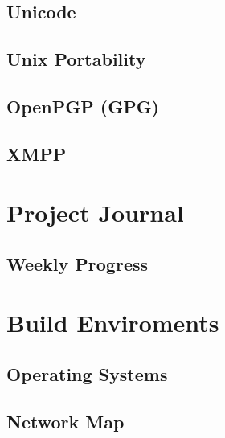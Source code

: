 \documentclass[a4paper,12pt]{report}
\begin{document}
\todo

\section{Unicode}



\section{Unix Portability}



\section{OpenPGP (GPG)}



\section{XMPP}

\todo

\chapter{Project Journal}

\label{chap:journal}

\section{Weekly Progress}

\label{sec:progress}

\todo


\chapter{Build Enviroments}

\section{Operating Systems}



\section{Network Map}


\end{document}
